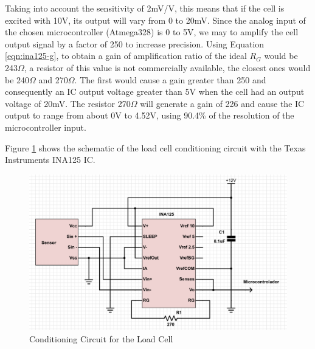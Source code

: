 		Taking into account the sensitivity of 2mV/V, this means that if the cell is excited with 10V, its output will vary from 0 to 20mV. Since the analog input of the chosen microcontroller (Atmega328) is 0 to 5V, we may to amplify the cell output signal by a factor of 250 to increase precision. Using Equation \ref{eqn:ina125-g}, to obtain a gain of amplification ratio of the ideal $R_{G}$ would be 243$\Omega$, a resistor of this value is not commercially available, the closest ones would be 240$\Omega$ and 270$\Omega$. The first would cause a gain greater than 250 and consequently an IC output voltage greater than 5V when the cell had an output voltage of 20mV. The resistor 270$\Omega$ will generate a gain of 226 and cause the IC output to range from about 0V to 4.52V, using 90.4\% of the resolution of the microcontroller input. 
		\par

		Figure \ref{fig:cic-cell} shows the schematic of the load cell conditioning circuit with the Texas Instruments INA125 IC.

		\begin{figure}[htbp]
			\centering
				\includegraphics[scale=0.35]{figuras/fig-cic-cell.png}
			\caption{Conditioning Circuit for the Load Cell}
			\label{fig:cic-cell}
		\end{figure}
